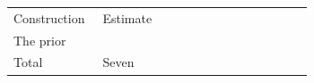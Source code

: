 \begin{tabular}{@{}p{0.28\linewidth}p{0.66\linewidth}@{}}Construction & Estimate \\ \multicolumn{2}{l}{The prior} \\ Total & Seven \\ \end{tabular}

